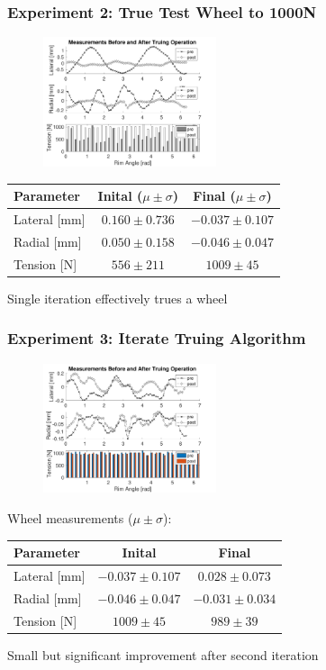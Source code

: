 \documentclass[mathserif]{beamer}
\begin{document}
\begin{frame}
\frametitle{Experiment 2: True Test Wheel to 1000N}
\begin{figure}
    \centering
    \includegraphics[width=2in]{./figs/exp2}
\end{figure}

\centering
\begin{tabular}{| l | c | c |}
    \hline
    Parameter & Inital ($\mu \pm \sigma$) & Final ($\mu \pm \sigma$)\\ \hline
    Lateral [mm] & $0.160\pm0.736$ &$-0.037\pm 0.107$ \\ \hline 
    Radial [mm] &$0.050\pm0.158$& $-0.046\pm0.047$ \\ \hline 
    Tension [N] &$556\pm211$& $1009\pm45$ \\ \hline
\end{tabular}
\begin{block}{}
    Single iteration effectively trues a wheel
\end{block}
\end{frame}

\begin{frame}
\frametitle{Experiment 3: Iterate Truing Algorithm}
\begin{figure}
    \centering
    \includegraphics[width=2in]{./figs/exp3}
\end{figure}
Wheel measurements ($\mu \pm \sigma$):
\centering
\begin{tabular}{| l | c | c |}
    \hline
    Parameter & Inital & Final \\ \hline
    Lateral [mm] & $-0.037\pm0.107$ &$0.028\pm 0.073$ \\ \hline 
    Radial [mm] &$-0.046\pm0.047$& $-0.031\pm0.034$ \\ \hline 
    Tension [N] &$1009\pm45$& $989\pm39$ \\ \hline 
\end{tabular}
\begin{block}{}
    Small but significant improvement after second iteration
\end{block}
\end{frame}
\end{document}
